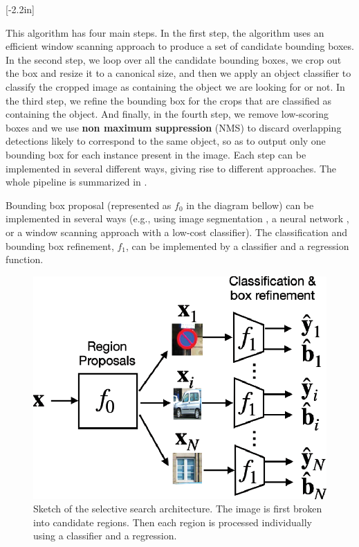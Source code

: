 [-2.2in]

This algorithm has four main steps. In the first step, the algorithm uses an efficient window scanning approach to produce a set of candidate bounding boxes. In the second step, we loop over all the candidate bounding boxes, we crop out the box and resize it to a canonical size, and then we apply an object classifier to classify the cropped image as containing the object we are looking for or not. In the third step, we refine the bounding box for the crops that are classified as containing the object. And finally, in the fourth step, we remove low-scoring boxes and we use {\bf non maximum suppression} (NMS) to discard overlapping detections likely to correspond to the same object, so as to output only one bounding box for each instance present in the image. Each step can be implemented in several different ways, giving rise to different approaches. The whole pipeline is summarized in \fig{\ref{fig:selective_search_pipeline}}.

Bounding box proposal (represented as $f_0$ in the diagram bellow) can be implemented in several ways (e.g., using image segmentation \cite{Uijlings2013}, a neural network \cite{Ren2015}, or a window scanning approach with a low-cost classifier). The classification and bounding box refinement, $f_1$, can be implemented by a classifier and a regression function.
\begin{figure}
    \centerline{
        \includegraphics[width=.4\linewidth]{figures/object_recognition/selective_search_architecture.eps}
    }
    \caption{Sketch of the selective search architecture. The image is first broken into candidate regions. Then each region is processed individually using a classifier and a regression.}
\end{figure}


